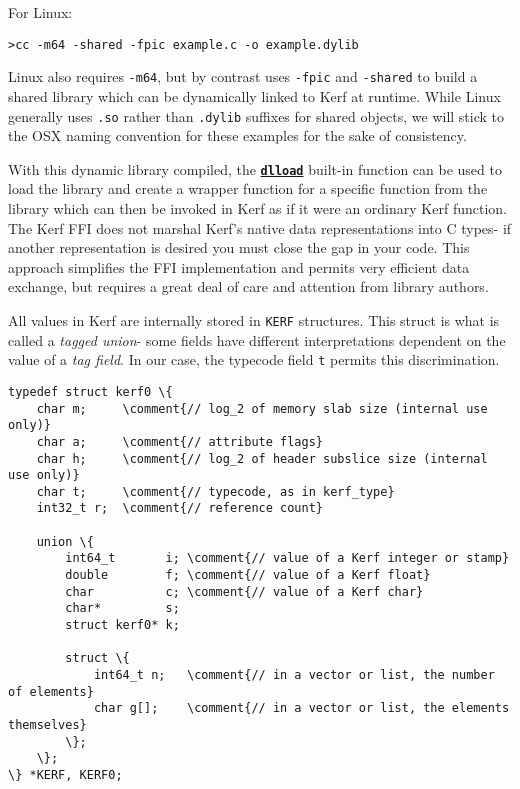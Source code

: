\documentclass{article}
\newcommand{\comment}[1]{\textcolor{Orange}{#1}}
\newcommand{\primu}[2]{\hyperref[prim:#2]{\textbf{\texttt{#1}}}}
\newcommand{\prim}[1]{\primu{#1}{#1}}
\begin{document}
\vspace{0.5cm}
For Linux:
\begin{Verbatim}
>cc -m64 -shared -fpic example.c -o example.dylib
\end{Verbatim}

Linux also requires \texttt{-m64}, but by contrast uses \texttt{-fpic} and \texttt{-shared} to build a shared library which can be dynamically linked to Kerf at runtime. While Linux generally uses \texttt{.so} rather than \texttt{.dylib} suffixes for shared objects, we will stick to the OSX naming convention for these examples for the sake of consistency. 

\vspace{0.5cm}

With this dynamic library compiled, the \prim{dlload} built-in function can be used to load the library and create a wrapper function for a specific function from the library which can then be invoked in Kerf as if it were an ordinary Kerf function. The Kerf FFI does not marshal Kerf's native data representations into C types- if another representation is desired you must close the gap in your code. This approach simplifies the FFI implementation and permits very efficient data exchange, but requires a great deal of care and attention from library authors.
\vspace{0.5cm}

\pagebreak

All values in Kerf are internally stored in \texttt{KERF} structures. This struct is what is called a \emph{tagged union}- some fields have different interpretations dependent on the value of a \emph{tag field}. In our case, the typecode field \texttt{t} permits this discrimination.

\begin{Verbatim}
typedef struct kerf0 \{
	char m;     \comment{// log_2 of memory slab size (internal use only)}
	char a;     \comment{// attribute flags}
	char h;     \comment{// log_2 of header subslice size (internal use only)}
	char t;     \comment{// typecode, as in kerf_type}
	int32_t r;  \comment{// reference count}
	
	union \{
		int64_t       i; \comment{// value of a Kerf integer or stamp}
		double        f; \comment{// value of a Kerf float}
		char          c; \comment{// value of a Kerf char}
		char*         s;
		struct kerf0* k;
		
		struct \{
			int64_t n;   \comment{// in a vector or list, the number of elements}
			char g[];    \comment{// in a vector or list, the elements themselves}
		\};
	\};
\} *KERF, KERF0;
\end{Verbatim}
\end{document}
